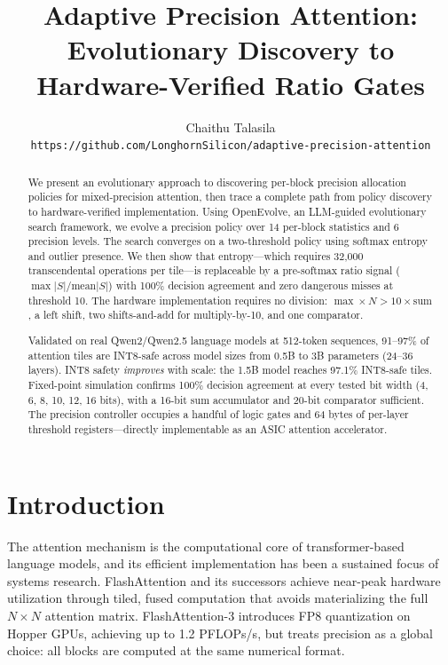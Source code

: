 \documentclass[10pt,twocolumn]{article}
\title{\textbf{Adaptive Precision Attention:\\
Evolutionary Discovery to Hardware-Verified Ratio Gates}}
\author{
  Chaithu Talasila\\
  \texttt{https://github.com/LonghornSilicon/adaptive-precision-attention}
}
\date{}
\begin{document}
\maketitle
\thispagestyle{fancy}

\begin{abstract}
We present an evolutionary approach to discovering per-block precision
allocation policies for mixed-precision attention, then trace a complete
path from policy discovery to hardware-verified implementation.
Using OpenEvolve, an LLM-guided evolutionary search framework, we evolve a
precision policy over 14 per-block statistics and 6 precision levels.
The search converges on a two-threshold policy using softmax entropy and
outlier presence. We then show that entropy---which requires 32{,}000
transcendental operations per tile---is replaceable by a pre-softmax
ratio signal ($\max|S|/\mathrm{mean}|S|$) with 100\% decision agreement
and zero dangerous misses at threshold 10. The hardware implementation
requires no division: $\max \times N > 10 \times \mathrm{sum}$, a left
shift, two shifts-and-add for multiply-by-10, and one comparator.

Validated on real Qwen2/Qwen2.5 language models at 512-token sequences,
91--97\% of attention tiles are INT8-safe across model sizes from 0.5B
to 3B parameters (24--36 layers). INT8 safety \emph{improves} with scale:
the 1.5B model reaches 97.1\% INT8-safe tiles. Fixed-point simulation
confirms 100\% decision agreement at every tested bit width (4, 6, 8,
10, 12, 16 bits), with a 16-bit sum accumulator and 20-bit comparator
sufficient. The precision controller occupies a handful of logic gates
and 64 bytes of per-layer threshold registers---directly implementable
as an ASIC attention accelerator.
\end{abstract}

\section{Introduction}

The attention mechanism is the computational core of transformer-based
language models, and its efficient implementation has been a sustained
focus of systems research. FlashAttention \citep{dao2022flashattention}
and its successors \citep{dao2023flashattention2,shah2024flashattention3}
achieve near-peak hardware utilization through tiled, fused computation
that avoids materializing the full $N \times N$ attention matrix.
FlashAttention-3 introduces FP8 quantization on Hopper GPUs, achieving
up to 1.2 PFLOPs/s, but treats precision as a global choice: all blocks
are computed at the same numerical format.
\end{document}

